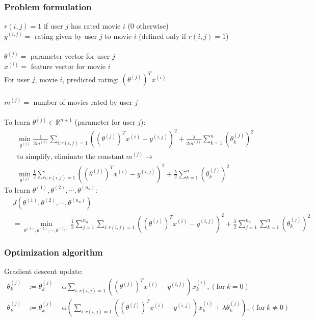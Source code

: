 \subsubsection{Problem formulation}
$r(i, j) = 1$ if user $j$ has rated movie $i$ (0 otherwise)\\
$y^{(i,j)} = $ rating given by user $j$ to movie $i$ (defined only if $r(i, j) = 1$)\\\\
$\theta^{(j)} = $ parameter vector for user $j$\\
$x^{(i)} = $ feature vector for movie $i$\\
For user $j$, movie $i$, predicted rating: $(\theta^{(j)} )^Tx^{(i)}$\\\\
$m^{(j)} = $ number of movies rated by user $j$\\\\
To learn $\theta^{(j)} \in \mathbb{R}^{n+1}$ (parameter for user $j$):
\begin{align*}
&\min_{\theta^{(j)}}\frac{1}{2m^{(j)}}\sum_{i : r(i,j)=1}((\theta^{(j)})^Tx^{(i)} - y^{(i,j)})^2 + \frac{\lambda}{2m^{(j)}}\sum_{k=1}^n(\theta_k^{(j)})^2\\
&\text{to simplify, eliminate the constant} ~ m^{(j)} \rightarrow \\
&\min_{\theta^{(j)}}\frac{1}{2}\sum_{i : r(i,j)=1}((\theta^{(j)})^Tx^{(i)} - y^{(i,j)})^2 + \frac{\lambda}{2}\sum_{k=1}^n(\theta_k^{(j)})^2
\end{align*}
To learn $\theta^{(1)}, \theta^{(2)}, \cdots, \theta^{(n_u)}$:
\begin{align}
&J(\theta^{(1)}, \theta^{(2)}, \cdots, \theta^{(n_u)}) \nonumber\\
&= \min_{\theta^{(1)}, \theta^{(2)}, \cdots, \theta^{(n_u)}}\frac{1}{2}\sum_{j=1}^{n_u}\sum_{i : r(i,j)=1}((\theta^{(j)})^Tx^{(i)} - y^{(i,j)})^2 + \frac{\lambda}{2}\sum_{j=1}^{n_u}\sum_{k=1}^n(\theta_k^{(j)})^2 \label{eq:CF1}
\end{align}

\subsubsection{Optimization algorithm}
Gradient descent update:
\begin{align*}
\theta_k^{(j)} &:= \theta_k^{(j)} - \alpha\sum_{i : r(i,j)=1} \left( (\theta^{(j)})^Tx^{(i)} - y^{(i,j)} \right) x_k^{(i)}, (\text{for} ~ k=0)\\
\theta_k^{(j)} &:= \theta_k^{(j)} - \alpha \left( \sum_{i : r(i,j)=1} \left( (\theta^{(j)})^Tx^{(i)} - y^{(i,j)} \right)x_k^{(i)} + \lambda\theta_k^{(j)}\right), (\text{for} ~ k \neq 0)
\end{align*}

